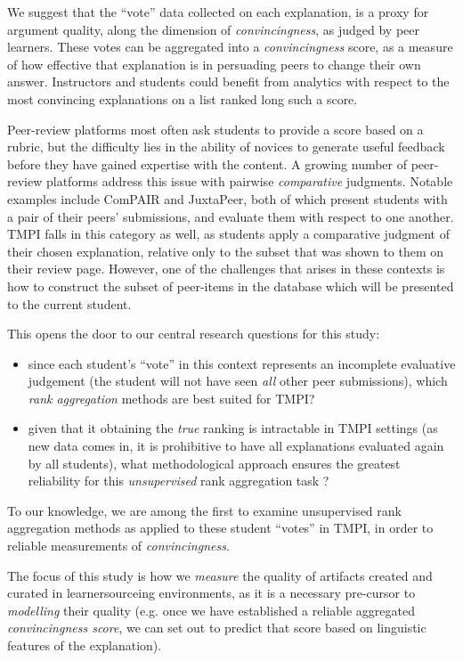 \documentclass[sigconf]{acmart}
\begin{document}
We suggest that the ``vote'' data collected on each explanation, is a proxy for 
argument quality, along the dimension of \textit{convincingness}, as judged by 
peer learners. 
These votes can be aggregated into a \textit{convincingness} score, as a 
measure of how effective that explanation is in persuading peers to change 
their own answer.
Instructors and students could benefit from analytics with respect to the most 
convincing explanations on a list ranked long such a score.

Peer-review platforms most often ask students to provide a score based on a 
rubric, but the difficulty lies in the ability of novices to generate useful 
feedback before they have gained expertise with the content. 
A growing number of peer-review platforms address this issue with pairwise
\textit{comparative} judgments.
Notable examples include ComPAIR\cite{potter_compair:_2017} and 
JuxtaPeer\cite{cambre_juxtapeer:_2018}, both of which present students with a 
pair of their peers' submissions, and evaluate them with respect to one another.
TMPI falls in this category as well, as students apply a comparative judgment 
of their chosen explanation, relative only to the subset that was shown to them 
on their review page. 
However, one of the challenges that arises in these contexts is how to 
construct the subset of peer-items in the database which will be presented to 
the current student.

This opens the door to our central research questions for this study: 
\begin{itemize}
	\item since each student's ``vote'' in this context represents an 
	incomplete evaluative judgement (the student will not have seen 
	\textit{all} other peer submissions), which \textit{rank aggregation} 
	methods are best suited for TMPI?
	\item given that it obtaining the \textit{true} ranking is intractable in 
	TMPI settings (as new data comes in, it is prohibitive to have all 
	explanations evaluated again by all students), what methodological approach 
	ensures the greatest reliability for this \textit{unsupervised} rank 
	aggregation task ?
\end{itemize}

	
To our knowledge, we are among the first to examine unsupervised rank 
aggregation methods as applied to these student ``votes'' in TMPI, in order to 
reliable measurements of \textit{convincingness}. 

The focus of this study is how we \textit{measure} the quality of artifacts 
created and curated in learnersourceing environments, as it is a necessary 
pre-cursor to \textit{modelling} their quality (e.g. once we have established a 
reliable aggregated \textit{convincingness score}, we can set out to predict 
that score based on linguistic features of the explanation).
\end{document}
